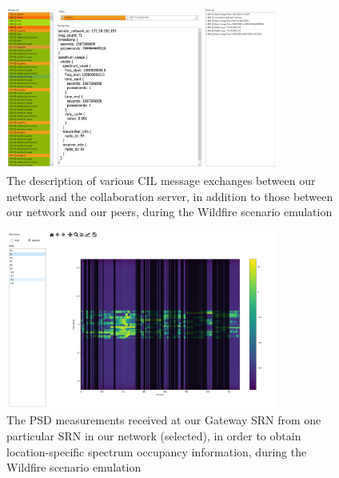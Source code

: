 \begin{figure} [htb]
    \centerline{
    \includegraphics[width = 0.8\textwidth]{Wildfire_Collab.PNG}}
    \caption{The description of various CIL message exchanges between our network and the collaboration server, in addition to those between our network and our peers, during the Wildfire scenario emulation}
    \label{fig:B.20}
\end{figure}
\begin{figure} [htb]
    \centerline{
    \includegraphics[width = 0.8\textwidth]{Wildfire_PSD.PNG}}
    \caption{The PSD measurements received at our Gateway SRN from one particular SRN in our network (selected), in order to obtain location-specific spectrum occupancy information, during the Wildfire scenario emulation}
    \label{fig:B.21}
\end{figure}

